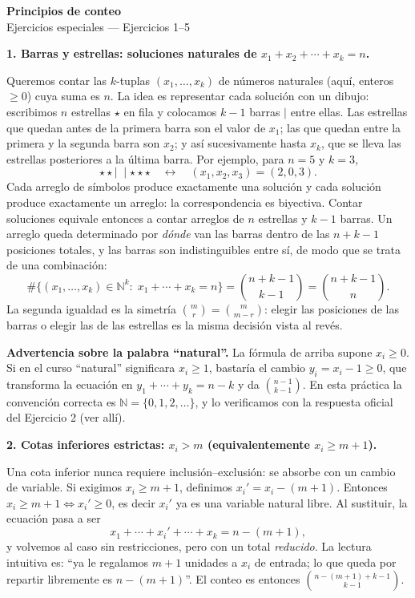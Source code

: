 \documentclass[11pt]{article}
\begin{document}
\begin{center}{\LARGE\bfseries Principios de conteo}\\[2pt]{\large Ejercicios especiales --- Ejercicios 1--5}\end{center}

\begin{teo}
\textbf{1. Barras y estrellas: soluciones naturales de $x_1+x_2+\cdots+x_k=n$.}

Queremos contar las $k$-tuplas $(x_1,\dots ,x_k)$ de números naturales (aquí, enteros $\ge 0$)
cuya suma es $n$. La idea es representar cada solución con un dibujo: escribimos $n$ estrellas
$\star$ en fila y colocamos $k-1$ barras $\mid$ entre ellas. Las estrellas que quedan antes de la
primera barra son el valor de $x_1$; las que quedan entre la primera y la segunda barra son $x_2$;
y así sucesivamente hasta $x_k$, que se lleva las estrellas posteriores a la última barra. Por ejemplo,
para $n=5$ y $k=3$,
\[
\star\star\mid\;\mid\star\star\star \quad\longleftrightarrow\quad (x_1,x_2,x_3)=(2,0,3).
\]
Cada arreglo de símbolos produce exactamente una solución y cada solución produce exactamente un
arreglo: la correspondencia es biyectiva. Contar soluciones equivale entonces a contar arreglos de
$n$ estrellas y $k-1$ barras. Un arreglo queda determinado por \emph{dónde} van las barras dentro de
las $n+k-1$ posiciones totales, y las barras son indistinguibles entre sí, de modo que se trata de una
combinación:
\[
\boxed{\;\#\{(x_1,\dots ,x_k)\in\mathbb{N}^k:\;x_1+\cdots+x_k=n\}=\binom{n+k-1}{k-1}=\binom{n+k-1}{n}.\;}
\]
La segunda igualdad es la simetría $\binom{m}{r}=\binom{m}{m-r}$: elegir las posiciones de las barras
o elegir las de las estrellas es la misma decisión vista al revés.

\medskip
\textbf{Advertencia sobre la palabra ``natural''.} La fórmula de arriba supone $x_i\ge 0$. Si en el
curso ``natural'' significara $x_i\ge 1$, bastaría el cambio $y_i=x_i-1\ge 0$, que transforma la
ecuación en $y_1+\cdots+y_k=n-k$ y da $\binom{n-1}{k-1}$. En esta práctica la convención correcta es
$\mathbb{N}=\{0,1,2,\dots\}$, y lo verificamos con la respuesta oficial del Ejercicio 2 (ver allí).

\medskip
\textbf{2. Cotas inferiores estrictas: $x_i>m$ (equivalentemente $x_i\ge m+1$).}

Una cota inferior nunca requiere inclusión--exclusión: se absorbe con un cambio de variable. Si exigimos
$x_i\ge m+1$, definimos $x_i'=x_i-(m+1)$. Entonces $x_i\ge m+1 \iff x_i'\ge 0$, es decir $x_i'$ ya es
una variable natural libre. Al sustituir, la ecuación pasa a ser
\[
x_1+\cdots+x_i'+\cdots+x_k=n-(m+1),
\]
y volvemos al caso sin restricciones, pero con un total \emph{reducido}. La lectura intuitiva es:
``ya le regalamos $m+1$ unidades a $x_i$ de entrada; lo que queda por repartir libremente es
$n-(m+1)$''. El conteo es entonces $\binom{n-(m+1)+k-1}{k-1}$.


\end{teo}
\end{document}

